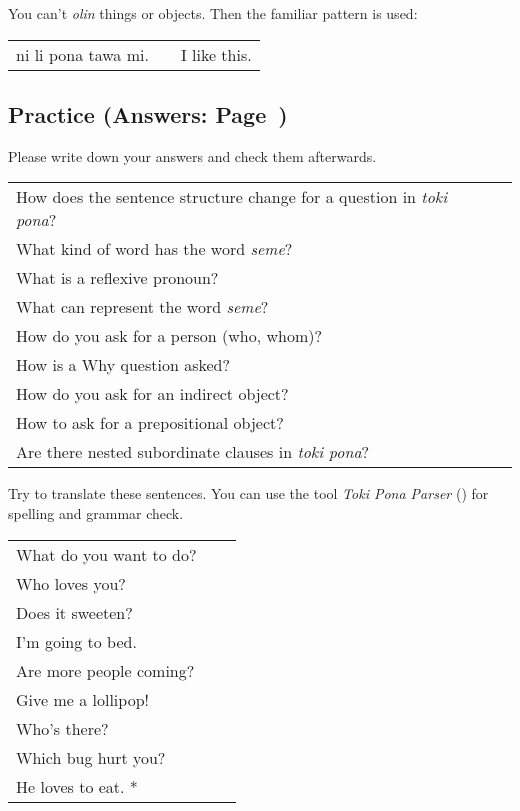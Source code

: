 You can't \textit{olin} things or objects. 
Then the familiar pattern is used:

\begin{supertabular}{p{5,5cm}|ll}
ni li pona tawa mi. && I like this.\\
\end{supertabular} 

%
%
%
\newpage
%
\subsection*{Practice (Answers: Page~\pageref{'questions_using_seme'})}
%
Please write down your answers and check them afterwards. 

\begin{supertabular}{p{5,5cm}|ll}
How does the sentence structure change for a question in \textit{toki pona}? &&  \\ %
What kind of word has the word \textit{seme}? &&  \\ %
What is a reflexive pronoun? &&  \\ %
What can represent the word \textit{seme}? &&   \\ %
How do you ask for a person (who, whom)? &&  \\ %
How is a Why question asked? &&  \\ %
How do you ask for an indirect object? &&  \\ %
How to ask for a prepositional object? &&  \\ %
Are there nested subordinate clauses in \textit{toki pona}? && \\ %
\end{supertabular}

Try to translate these sentences. 
You can use the tool \textit{Toki Pona Parser} (\cite{www:rowa:02}) for spelling and grammar check. 

\begin{supertabular}{p{5,5cm}|ll}
What do you want to do? &&   \\ %
Who loves you? &&   \\ %
Does it sweeten?  &&  \\ %
I'm going to bed. && \\  %
Are more people coming? &&  \\  %
Give me a lollipop! && \\   %
Who's there? &&   \\ %
Which bug hurt you?  &&  \\ %
He loves to eat. * &&  \\ %
\end{supertabular}

